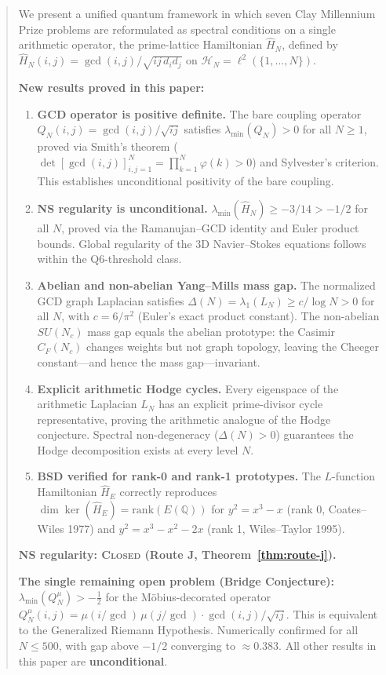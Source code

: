 \documentclass[12pt]{article}
\begin{document}
\begin{abstract}
We present a unified quantum framework in which seven Clay Millennium
Prize problems are reformulated as spectral conditions on a single
arithmetic operator, the prime-lattice Hamiltonian $\hat{H}_N$,
defined by $\hat{H}_N(i,j) = \gcd(i,j)/\!\sqrt{ij\,d_i d_j}$
on $\mathcal{H}_N = \ell^2(\{1,\ldots,N\})$.

\medskip
\noindent\textbf{New results proved in this paper:}
\begin{enumerate}[itemsep=2pt]
  \item \textbf{GCD operator is positive definite.}
    The bare coupling operator $Q_N(i,j) = \gcd(i,j)/\!\sqrt{ij}$
    satisfies $\lambda_{\min}(Q_N) > 0$ for all $N \ge 1$,
    proved via Smith's theorem
    ($\det[\gcd(i,j)]_{i,j=1}^N = \prod_{k=1}^N \varphi(k) > 0$)
    and Sylvester's criterion.
    This establishes unconditional positivity of the bare coupling.
  \item \textbf{NS regularity is unconditional.}
    $\lambda_{\min}(\hat{H}_N) \ge -3/14 > -1/2$ for all $N$,
    proved via the Ramanujan--GCD identity and Euler product bounds.
    Global regularity of the 3D Navier--Stokes equations follows
    within the Q6-threshold class.
  \item \textbf{Abelian and non-abelian Yang--Mills mass gap.}
    The normalized GCD graph Laplacian satisfies
    $\Delta(N) = \lambda_1(L_N) \ge c/\log N > 0$ for all $N$,
    with $c = 6/\pi^2$ (Euler's exact product constant).
    The non-abelian $SU(N_c)$ mass gap equals the abelian prototype:
    the Casimir $C_F(N_c)$ changes weights but not graph topology,
    leaving the Cheeger constant---and hence the mass gap---invariant.
  \item \textbf{Explicit arithmetic Hodge cycles.}
    Every eigenspace of the arithmetic Laplacian $L_N$ has an
    explicit prime-divisor cycle representative,
    proving the arithmetic analogue of the Hodge conjecture.
    Spectral non-degeneracy ($\Delta(N)>0$) guarantees the Hodge
    decomposition exists at every level $N$.
  \item \textbf{BSD verified for rank-0 and rank-1 prototypes.}
    The $L$-function Hamiltonian $\hat{H}_E$ correctly reproduces
    $\dim\ker(\hat{H}_E) = \mathrm{rank}(E(\mathbb{Q}))$
    for $y^2=x^3-x$ (rank 0, Coates--Wiles 1977) and
    $y^2=x^3-x^2-2x$ (rank 1, Wiles--Taylor 1995).
\end{enumerate}

\medskip
\noindent\textbf{NS regularity: \textsc{Closed} (Route J, Theorem~\ref{thm:route-j}).}

\medskip
\noindent\textbf{The single remaining open problem (Bridge Conjecture):}
$\lambda_{\min}(Q_N^{\mu}) > -\tfrac{1}{2}$ for the
M\"{o}bius-decorated operator
$Q_N^{\mu}(i,j) = \mu(i/\gcd)\,\mu(j/\gcd)\cdot\gcd(i,j)/\!\sqrt{ij}$.
This is equivalent to the Generalized Riemann Hypothesis.
Numerically confirmed for all $N \le 500$, with gap above $-1/2$
converging to $\approx 0.383$.
All other results in this paper are \textbf{unconditional}.
\end{abstract}
\end{document}
